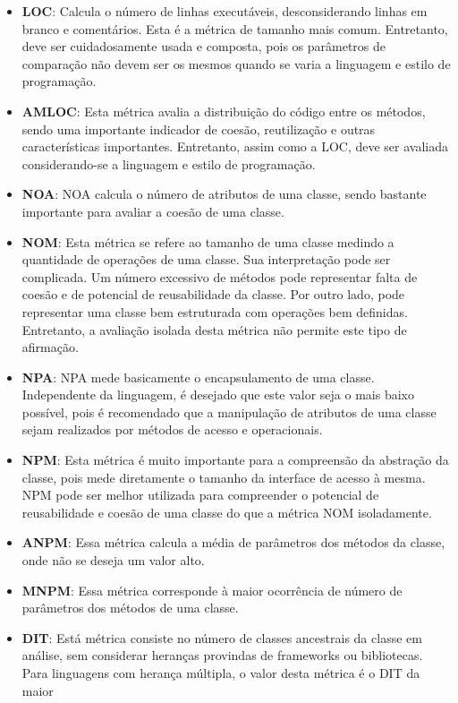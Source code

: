 \begin{itemize}
  \item \textbf{LOC}: Calcula o número de linhas executáveis, desconsiderando linhas 
    em branco e comentários. Esta é a métrica de tamanho mais comum. Entretanto, deve ser cuidadosamente usada e composta, pois
    os parâmetros de comparação não devem ser os mesmos quando se varia a linguagem e estilo de programação.
  \item \textbf{AMLOC}: Esta métrica avalia a distribuição
    do código entre os métodos, sendo uma importante indicador de coesão, reutilização e outras características importantes. 
    Entretanto, assim como a LOC, deve ser avaliada considerando-se a linguagem e estilo de programação.
  \item \textbf{NOA}: NOA calcula o número de atributos de uma classe, sendo 
    bastante importante para avaliar a coesão de uma classe.
  \item \textbf{NOM}: Esta métrica se refere ao tamanho de uma classe medindo a 
    quantidade de operações de uma classe. Sua interpretação pode ser complicada. Um número excessivo de métodos pode 
    representar falta de coesão e de potencial de reusabilidade da classe. Por outro lado, pode representar uma classe bem 
    estruturada com operações bem definidas. Entretanto, a avaliação isolada desta métrica não permite este tipo de afirmação.
  \item \textbf{NPA}: NPA mede basicamente o encapsulamento de uma classe. Independente da linguagem, é desejado que este valor 
    seja o mais baixo possível, pois é recomendado que a manipulação de atributos de uma classe sejam realizados por métodos de 
    acesso e operacionais.
  \item \textbf{NPM}: Esta métrica é muito importante para a compreensão da abstração da classe, pois mede diretamente o 
    tamanho da interface de acesso à mesma. NPM pode ser melhor utilizada para compreender o potencial de reusabilidade e 
    coesão de uma classe do que a métrica NOM isoladamente.
  \item \textbf{ANPM}: Essa métrica calcula a média de parâmetros dos métodos da classe, onde não se deseja um valor alto.
  \item \textbf{MNPM}: Essa métrica corresponde à maior ocorrência de número de parâmetros dos métodos de uma classe.
  \item \textbf{DIT}: Está métrica consiste no número de classes ancestrais da classe em análise, sem considerar heranças 
    provindas de frameworks ou bibliotecas. Para linguagens com herança múltipla, o valor desta métrica é o DIT da maior 

\end{itemize}
